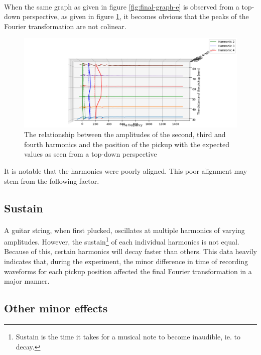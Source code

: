 \documentclass{article}
\begin{document}
\paragraph*{}
When the same graph as given in figure \ref{fig:final-graph-e} is observed 
from a top-down perspective, as given in figure \ref{fig:final-graph-e-t}, it 
becomes obvious that the peaks of the Fourier transformation are not colinear. 
\begin{figure}[ht]
	\centering
	\includegraphics[width=\textwidth]{img/final-graph-e-t}
	\caption{The relationship between the amplitudes of the second, third and 
	fourth harmonics and the position of the pickup with the expected values 
as seen from a top-down perspective}
	\label{fig:final-graph-e-t}
\end{figure}
It is notable that the harmonics were poorly aligned. This poor alignment may 
stem from the following factor.

\subsection{Sustain}

\paragraph*{}
A guitar string, when first plucked, oscillates at multiple harmonics of 
varying amplitudes. However, the sustain\footnote{Sustain is the time it takes 
for a musical note to become inaudible, ie. to decay.} of each individual 
harmonics is not equal. Because of this, certain harmonics will decay faster 
than others. This data heavily indicates that, during the experiment, the 
minor difference in time of recording waveforms for each pickup position 
affected the final Fourier transformation in a major manner.

\subsection{Other minor effects}
\end{document}

